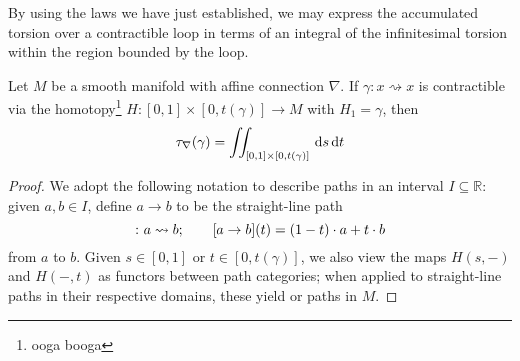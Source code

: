 By using the laws we have just established, we may express the accumulated torsion over a contractible loop in terms of an integral of the infinitesimal torsion within the region bounded by the loop.

\begin{theorem}
  Let $M$ be a smooth manifold with affine connection $\nabla$. If $\gamma \colon x \rightsquigarrow x$ is contractible via the homotopy\footnote{ooga booga} $H \colon [0, 1] \times [0, t(\gamma)] \to M$ with $H_1 = \gamma$, then 
  \begin{equation}
    \tau_\nabla (\gamma) = \iint_{[0, 1] \times [0, t(\gamma)]} \, {\rm d} s\, {\rm d} t 
  \end{equation}
\end{theorem}
\begin{proof}
  We adopt the following notation to describe paths in an interval $I \subseteq \mathbb{R}$: given $a, b \in I$, define $a \to b$ to be the straight-line path
  \begin{equation}
    [a \to b] \colon a \rightsquigarrow b; \quad \quad [\hspace{-0.25pt}a \to b](t) = (1-t) \cdot a + t \cdot b
  \end{equation} 
  from $a$ to $b$. Given $s \in [0, 1]$ or $t \in [0, t(\gamma)]$, we also view the maps $H(s, -)$ and $H(-, t)$ as functors between path categories; when applied to straight-line paths in their respective domains, these yield  or  paths in $M$.



\end{proof}
